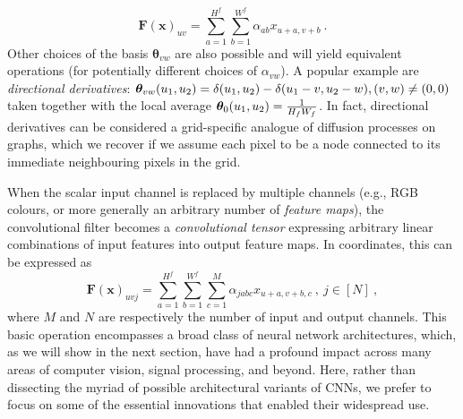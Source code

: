 \begin{equation}\mathbf{F}(\mathbf{x})_{uv}= \sum_{a=1}^{H^f}\sum_{b=1}^{W^f} {\alpha}_{ab} x_{u+a, v+b}~.
\end{equation}
Other choices of the basis $\boldsymbol{\theta}_{vw}$ are also possible and will yield equivalent operations (for potentially different choices of $\alpha_{vw}$). A popular example are \emph{directional derivatives}: $\boldsymbol{\theta}_{vw}(u_1,u_2) = \delta(u_1, u_2) - \delta(u_1-v,u_2-w), (v,w) \neq (0,0) $ taken together with the local average $\boldsymbol{\theta}_{0}(u_1,u_2) = \frac{1}{H_fW_f}$. In fact, directional derivatives can be considered a grid-specific analogue of diffusion processes on graphs, which we recover if we assume each pixel to be a node connected to its immediate neighbouring pixels in the grid.

When the scalar input channel is replaced by multiple channels (e.g., RGB colours, or more generally an arbitrary number of \emph{feature maps}), the convolutional filter becomes a {\em convolutional tensor} expressing arbitrary linear combinations of input features into output feature maps. In coordinates, this can be expressed as 
%
\begin{equation}
\label{eq:basiccnnlayer}
\mathbf{F}(\mathbf{x})_{uvj}= \sum_{a=1}^{H^f}\sum_{b=1}^{W^f}\sum_{c=1}^M {\alpha}_{jabc} x_{u+a, v+b, c}~,~ j\in[N]~,
\end{equation}
%
where $M$ and $N$ are respectively the number of input and output channels. 
This basic operation encompasses a broad class of neural network architectures, which, as we will show in the next section, have had a profound impact across many areas of computer vision, signal processing, and beyond. Here, rather than dissecting the myriad of possible architectural variants of CNNs, we prefer to focus on some of the essential innovations that enabled their widespread use.  



